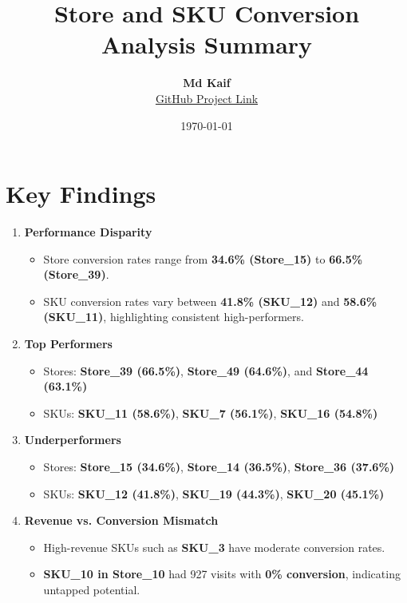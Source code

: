 \documentclass[11pt,a4paper]{article}
\title{\textbf{\textcolor{primary}{Store and SKU Conversion Analysis Summary}}}
\author{\textbf{Md Kaif} \\ \href{https://github.com/yourusername/your-repo}{\textcolor{primary}{GitHub Project Link}}}
\date{\small\today}
\begin{document}
\maketitle

\section*{Key Findings}

\begin{enumerate}
    \item \textbf{Performance Disparity}
    \begin{itemize}
        \item Store conversion rates range from \textbf{34.6\% (Store\_15)} to \textbf{66.5\% (Store\_39)}.
        \item SKU conversion rates vary between \textbf{41.8\% (SKU\_12)} and \textbf{58.6\% (SKU\_11)}, highlighting consistent high-performers.
    \end{itemize}

    \item \textbf{Top Performers}
    \begin{itemize}
        \item Stores: \textbf{Store\_39 (66.5\%)}, \textbf{Store\_49 (64.6\%)}, and \textbf{Store\_44 (63.1\%)}
        \item SKUs: \textbf{SKU\_11 (58.6\%)}, \textbf{SKU\_7 (56.1\%)}, \textbf{SKU\_16 (54.8\%)}
    \end{itemize}

    \item \textbf{Underperformers}
    \begin{itemize}
        \item Stores: \textbf{Store\_15 (34.6\%)}, \textbf{Store\_14 (36.5\%)}, \textbf{Store\_36 (37.6\%)}
        \item SKUs: \textbf{SKU\_12 (41.8\%)}, \textbf{SKU\_19 (44.3\%)}, \textbf{SKU\_20 (45.1\%)}
    \end{itemize}

    \item \textbf{Revenue vs. Conversion Mismatch}
    \begin{itemize}
        \item High-revenue SKUs such as \textbf{SKU\_3} have moderate conversion rates.
        \item \textbf{SKU\_10 in Store\_10} had 927 visits with \textbf{0\% conversion}, indicating untapped potential.
    \end{itemize}
\end{enumerate}
\end{document}
